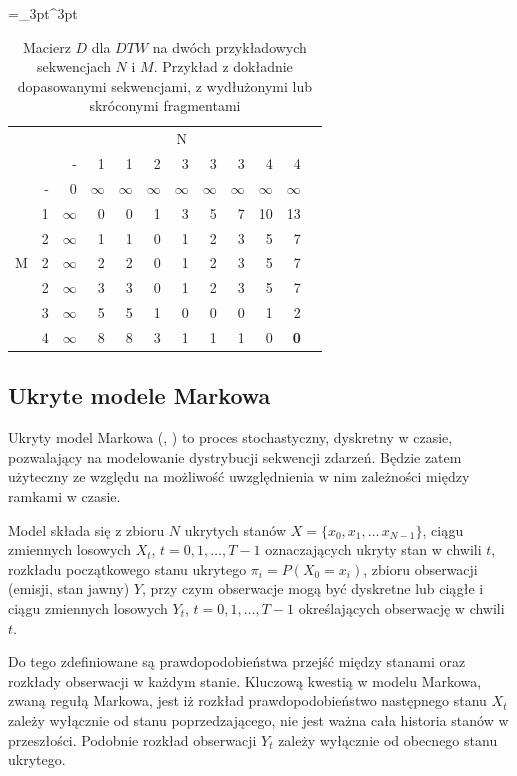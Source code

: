 \begin{table}[H]
    \caption{Macierz $D$ dla $DTW$ na dwóch przykładowych sekwencjach $N$ i $M$. Przykład z dokładnie dopasowanymi sekwencjami, z wydłużonymi lub skróconymi fragmentami}
    \centering
    \label{tab:dtw_example1}
    \small
    \tabulinesep =_3pt^3pt
    \begin{tabu}{r*{11}{r}}
         & & 
        \\
        & & - & 1 & 1 & 2 & 3 & 3 & 3 & 4 & 4
        \\ \midrule
         & - & 0 & $\infty$ & $\infty$ & $\infty$ & $\infty$ & $\infty$ & $\infty$ & $\infty$ & $\infty$
        \\
        & 1 & $\infty$ & 0 & 0 & 1 & 3 & 5 & 7 & 10 & 13
        \\
        & 2 & $\infty$ & 1 & 1 & 0 & 1 & 2 & 3 & 5 & 7
        \\
        & 2 & $\infty$ & 2 & 2 & 0 & 1 & 2 & 3 & 5 & 7
        \\
        & 2 & $\infty$ & 3 & 3 & 0 & 1 & 2 & 3 & 5 & 7
        \\
        & 3 & $\infty$ & 5 & 5 & 1 & 0 & 0 & 0 & 1 & 2
        \\
        & 4 & $\infty$ & 8 & 8 & 3 & 1 & 1 & 1 & 0 & \textbf{0}
        \\
    \end{tabu}
\end{table}

\subsection{Ukryte modele Markowa}\label{sec:hmm}

Ukryty model Markowa (, ) to proces stochastyczny,
dyskretny w czasie, pozwalający na modelowanie dystrybucji
sekwencji zdarzeń. Będzie zatem użyteczny ze względu na możliwość uwzględnienia w nim zależności
między ramkami w czasie.

Model składa się z zbioru $N$ ukrytych stanów $X = \{x_0, x_1, \dots\, x_{N-1}\}$, ciągu zmiennych losowych
$X_t$, $t = 0, 1, \dots, T - 1$ oznaczających ukryty stan w chwili $t$, rozkładu początkowego stanu ukrytego
$\pi_i = P(X_0 = x_i)$, zbioru obserwacji (emisji, stan jawny) $Y$, przy czym obserwacje mogą być dyskretne
lub ciągłe i ciągu zmiennych losowych $Y_t$, $t = 0, 1, \dots, T - 1$ określających obserwację w chwili $t$.

Do tego zdefiniowane są prawdopodobieństwa przejść między stanami oraz rozkłady obserwacji w każdym stanie.
Kluczową kwestią w modelu Markowa, zwaną regułą Markowa, jest iż rozkład prawdopodobieństwo następnego stanu $X_t$
zależy wyłącznie od stanu poprzedzającego, nie jest ważna cała historia stanów w przeszłości. Podobnie rozkład
obserwacji $Y_t$ zależy wyłącznie od obecnego stanu ukrytego.

